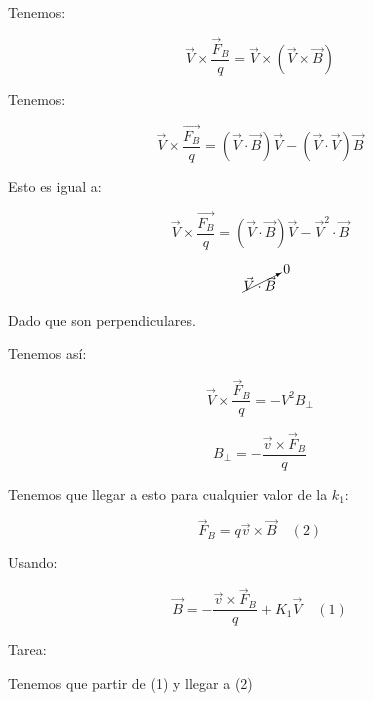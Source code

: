 \documentclass{article}
\begin{document}
Tenemos:


\[ \vec{V} \times \frac{ \vec{F}_{B} }{q} = \vec{V} \times (\vec{V} \times \vec{B})  \]


Tenemos:


\[ \vec{V} \times \frac{ \vec{F_{B}} }{q} = (\vec{V}\cdot \vec{B})\vec{V} - (\vec{V}\cdot \vec{V})\vec{B}  \]


Esto es igual a:


\[ \vec{V} \times \frac{ \vec{F_{B}} }{q} = (\vec{V}\cdot \vec{B})\vec{V} - \vec{V}^{2}\cdot\vec{B}  \]


\[ \cancelto{0}{ \vec{V}\cdot \vec{B}  } \]



Dado que son perpendiculares.




Tenemos así:

\[ \vec{V} \times \frac{ \vec{F}_{B} }{q} = -V^{2}B_{\perp}  \]


\[  B_{\perp} = - \frac{ \vec{v}\times \vec{F}_{B} }{q} \]



Tenemos que llegar a esto para cualquier valor de la $k_{1}$:


\[ \vec{F}_{B} = q\vec{v}\times \vec{B} \quad (2) \]


Usando:


\[  \boxed{  \vec{B}  = - \frac{\vec{v} \times \vec{F}_{B} }{q} + K_{1}\vec{V}  }  \quad (1) \]


Tarea:

Tenemos que partir de (1) y llegar a (2)
\end{document}
